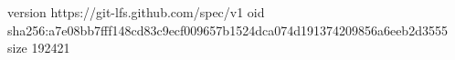 version https://git-lfs.github.com/spec/v1
oid sha256:a7e08bb7fff148cd83c9ecf009657b1524dca074d191374209856a6eeb2d3555
size 192421
